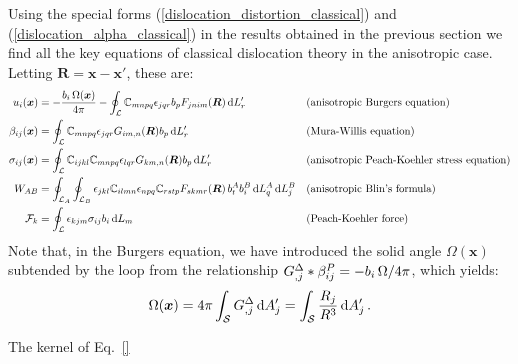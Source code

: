 Using the special forms (\ref{dislocation_distortion_classical}) and (\ref{dislocation_alpha_classical}) in the results obtained in the previous section we find all the key equations of classical dislocation theory in the anisotropic case. Letting $\bm R=\bm x-\bm x'$, these are:
\begin{subequations}
\begin{align}
u_i(\bm x)
&=-\frac{b_i\, \Omega(\bm
  x)}{4\pi}-\oint_{\mathcal{L}}\mathbb{C}_{mnpq}\epsilon_{jqr}b_pF_{jnim}(\bm
R)\, \text{d}L_r' && \text{(anisotropic Burgers equation)}\\
\beta_{ij}(\bm x)&=\oint_{\mathcal{L}}\mathbb{C}_{mnpq}\epsilon_{jqr}G_{im,n}(\bm R)b_p\, \text{d}L_r' && \text{(Mura-Willis equation)}\\
\sigma_{ij}(\bm
x)&=\oint_{\mathcal{L}}\mathbb{C}_{ijkl}\mathbb{C}_{mnpq}\epsilon_{lqr}G_{km,n}(\bm
R)b_p\, \text{d}L_r' && \text{(anisotropic Peach-Koehler stress equation)}\label{classicaCauchyStress}\\
W_{AB}&=\oint_{\mathcal{L}_A}\oint_{\mathcal{L}_B}\epsilon_{jkl}\mathbb{C}_{ilmn}\epsilon_{npq}\mathbb{C}_{rstp}F_{skmr}(\bm R)\, b^{A}_{t} b^{B}_{i} \, \text{d}L^A_{q}\, \text{d}L^B_{j}&&\text{(anisotropic Blin's formula) }\\
\mathcal{F}_k&=\oint_\mathcal{L}\epsilon_{kjm}\sigma_{ij}b_i\, \text{d}L_m&&\text{(Peach-Koehler force)}
\end{align}
\label{class_aniso_all}
\end{subequations}
Note that, in the Burgers equation, we have introduced the solid angle  $\Omega(\bm x)$ subtended by the loop from the relationship  $G^\Delta_{,j}*\beta^{P}_{ij}=-{b_i\, \Omega}/{4\pi}$, which yields:
\begin{align}
\Omega(\bm x)=4\pi\int_\mathcal{S}G^\Delta_{,j}\, \text{d}A_j'=\int_\mathcal{S}\frac{R_j}{R^3}\, \text{d}A_j'\, .
\end{align}

The kernel of Eq.~\eqref{}





